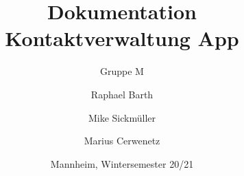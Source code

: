 
 \subject{Mobile Anwendungen}   %

\title{Dokumentation\\ Kontaktverwaltung App}
\subtitle{Gruppe M}
\author{Raphael Barth \and Mike Sickmüller \and Marius Cerwenetz}

\date{Mannheim, Wintersemester 20/21}





